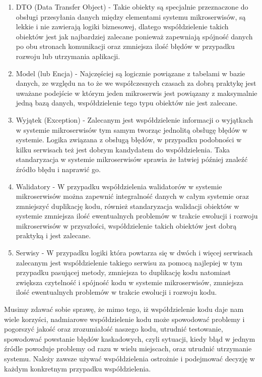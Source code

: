 \documentclass[runningheads,12pt]{llncs}
\begin{document}
\begin{enumerate}
    \item DTO (Data Transfer Object) - Takie obiekty są specjalnie przeznaczone do obsługi przesyłania danych między elementami systemu mikroserwisów, są lekkie i nie zawierają logiki biznesowej, dlatego współdzielenie takich obiektów jest jak najbardziej zalecane ponieważ zapewniają spójność danych po obu stronach komunikacji oraz zmniejsza ilość błędów w przypadku rozwoju lub utrzymania aplikacji.
    \item Model (lub Encja) - Najczęściej są logicznie powiązane z tabelami w bazie danych, ze względu na to że we współczesnych czasach za dobrą praktykę jest uważane podejście w którym jeden mikroserwis jest powiązany z maksymalnie jedną bazą danych, współdzielenie tego typu obiektów nie jest zalecane.
    \item Wyjątek (Exception) - Zalecanym jest współdzielenie informacji o wyjątkach w systemie mikroserwisów tym samym tworząc jednolitą obsługę błędów w systemie. Logika związana z obsługą błędów, w przypadku podobności w kilku serwisach też jest dobrym kandydatem do współdzielenia. Taka standaryzacja w systemie mikroserwisów sprawia że łatwiej później znaleźć źródło błędu i naprawić go.
    \item Walidatory - W przypadku współdzielenia walidatorów w systemie mikroserwisów można zapewnić integralność danych w całym systemie oraz zmniejszyć duplikację kodu, również standaryzacja walidacji obiektów w systemie zmniejsza ilość ewentualnych problemów w trakcie ewolucji i rozwoju mikroserwisów w przyszłości, współdzielenie takich obiektów jest dobrą praktyką i jest zalecane.
    \item Serwisy - W przypadku logiki która powtarza się w dwóch i więcej serwisach zalecanym jest współdzielenie takiego serwisu za pomocą najlepiej w tym przypadku pasującej metody, zmniejsza to duplikację kodu natomiast zwiększa czytelność i spójność kodu w systemie mikroserwisów, zmniejsza ilość ewentualnych problemów w trakcie ewolucji i rozwoju kodu.
\end{enumerate}

Musimy zdawać sobie sprawę, że mimo tego, iż współdzielenie kodu daje nam wiele korzyści, nadmiarowe współdzielenie kodu może spowodować problemy i pogorszyć jakość oraz zrozumiałość naszego kodu, utrudnić testowanie, spowodować powstanie błędów kaskadowych, czyli sytuacji, kiedy błąd w jednym źródle powoduje problemy od razu w wielu miejscach, oraz utrudnić utrzymanie systemu. Należy zawsze używać współdzielenia ostrożnie i podejmować decyzję w każdym konkretnym przypadku współdzielenia.
\end{document}
